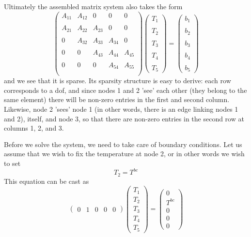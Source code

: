 Ultimately the assembled matrix system also takes the form
\[
\left(
\begin{array}{ccccc}
A_{11} & A_{12} & 0& 0& 0\\ \\
A_{21} & A_{22} & A_{23}& 0 & 0\\\\
0 & A_{32} & A_{33}&  A_{34}  & 0\\\\
0&0&   A_{43} & A_{44}&  A_{45} \\\\
0&0&0   & A_{54}&  A_{55} \\\\
\end{array}
\right)
\left(
\begin{array}{c}
T_1 \\\\ T_2 \\\\ T_3 \\\\ T_4 \\\\ T_5
\end{array}
\right)
=
\left(
\begin{array}{c}
b_1\\\\
b_2\\\\
b_3\\\\
b_4\\\\
b_5
\end{array}
\right)
\]
and we see that it is sparse. Its sparsity structure is easy to derive: each row corresponds to a dof, 
and since nodes 1 and 2 'see' each other (they belong to the same element) there will be non-zero entries
in the first and second column. 
Likewise, node 2 'sees' node 1 (in other words, there is an edge linking nodes 1 and 2), itself, 
and node 3, so that there are non-zero entries in the second row at columns 1, 2, and 3.

Before we solve the system, we need to take care of boundary conditions.
Let us assume that we wish to fix the temperature at node 2, or in other words 
we wish to set 
\[
T_2 = T^{bc}
\]
This equation can be cast as
\[
\left(
\begin{array}{ccccc}
 0 & 1 & 0 & 0 & 0
\end{array}
\right)
\left(
\begin{array}{c}
T_1 \\ T_2 \\ T_3 \\ T_4 \\ T_5
\end{array}
\right)
=
\left(
\begin{array}{c}
0 \\
T^{bc} \\
0 \\
0 \\
0
\end{array}
\right)
\]

